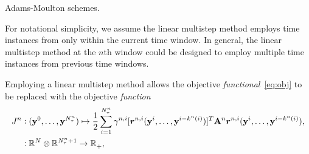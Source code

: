 Adams-Moulton schemes. 
\begin{remark}\label{remark:LMS}
For notational simplicity, we assume the linear multistep method employs time instances from only within the current time window. In general, the linear multistep method at the $n$th window could be designed to employ multiple time instances from previous time windows.
\end{remark}
Employing a linear multistep method allows the objective \textit{functional}~\eqref{eq:obj} to be replaced with the objective \textit{function}
\begin{equation}\label{eq:obj_lms}
\begin{split} 
\objectiveArgLMS{n} &\vcentcolon (\stateyDiscreteArgnt{0},\ldots,\stateyDiscreteArgnt{\nstepsArg{n}}) \mapsto
\frac{1}{2} \sum_{i=1}^{\nstepsArg{n}} \quadWeightsLMSScalarArg{n}{i} [\residArg{n,i}(\stateyDiscreteArgnt{i},\ldots, \stateyDiscreteArgnt{i-k^n(i)})]^T  \stweightingMatArgt{n}{\timeWindowArg{n}{i}} \residArg{n,i}(\stateyDiscreteArgnt{i},\ldots, \stateyDiscreteArgnt{i-k^n(i)}), \\
&\vcentcolon \RR{\fomdim} \otimes \RR{\nstepsArg{n}+1} \rightarrow
\RR{}_+, 
\end{split}
\end{equation}
